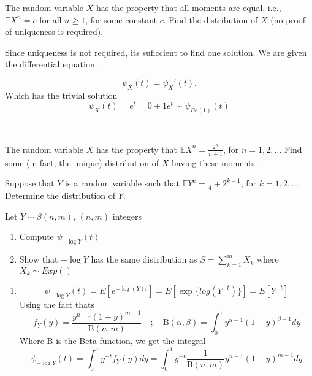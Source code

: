 \begin{enumerate}[label=(\alph*)]
\problem %
The random variable $X$ has the property that all moments are equal, i.e., $\mathbb{E}X^n = c$ for all $n \geq 1$, for some constant $c$. Find the distribution of $X$ (no proof of uniqueness is required).

\solution Since uniqueness is not required, its suficcient to find one solution. We are given the differential equation.

\[
\psi_X(t) = \psi_X'(t).
\]
Which has the trivial solution \[
    \psi_X(t) = e^t = 0 + 1e^t \sim \psi_{Be(1)}(t)
\]


\

\problem %
The random variable $X$ has the property that $\mathbb{E}X^n = \frac{2^n}{n+1}$, for $n = 1, 2, \dots$ Find some (in fact, the unique) distribution of $X$ having these moments.

\problem %
Suppose that $Y$ is a random variable such that $\mathbb{E}Y^k = \frac{1}{4} + 2^{k-1}$, for $k = 1, 2, \dots$ Determine the distribution of $Y$.

\problem %
Let $Y \sim \beta(n,m)$, $(n, m)$ integers 
\begin{enumerate}
    \item Compute $ \psi_{-\log Y}(t)$
    \item Show that $-\log Y$ has the same distribution as $S = \sum_{k=1}^{m}X_k$ where $X_k \sim Exp()$
\end{enumerate}







\solution

\begin{enumerate}
    \item \[
        \psi_{-\log Y}(t) =  E[e^{-\log(Y)t}] = E[\exp\{log(Y^{-t})\}] = E[Y^{-t}]
    \]
    Using the fact thats
    \[f_Y(y)=\frac{y^{n-1}(1-y)^{m-1}}{ \mathrm{B}(n,m)}\hspace{1em}; \hspace{1em} \mathrm{B}(\alpha ,\beta) = \int_{0}^{1} y^{\alpha-1} (1-y)^{\beta-1} dy
    \] 
    Where $ \mathrm {B}$ is the Beta function, we get the integral
\[
    \psi_{-\log Y}(t) = \int_{0}^{1} y^{-t} f_Y(y) dy  = \int_{0}^{1} y^{-t} \frac{1}{\mathrm{B}(n,m)} y^{n-1} (1-y)^{m-1} dy
\]



\end{enumerate}
\end{enumerate}
